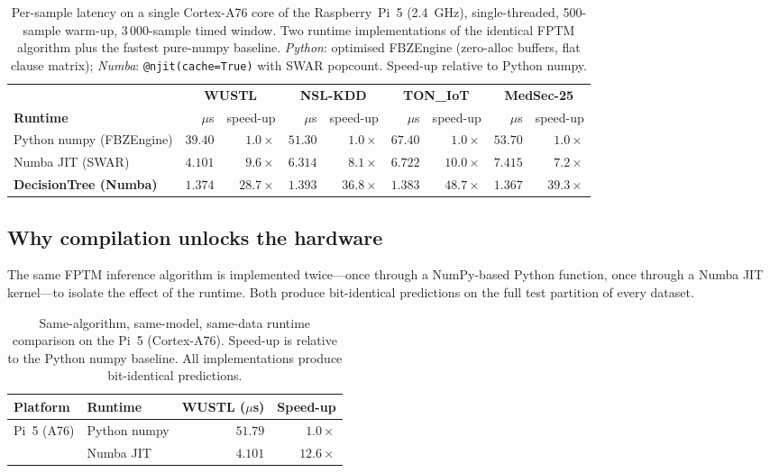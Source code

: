 \documentclass[journal,10pt]{IEEEtran}
\begin{document}
\begin{table}[t]
\centering\small
\caption{Per-sample latency on a single Cortex-A76 core of the
         Raspberry~Pi~5 (2.4~GHz), single-threaded, 500-sample warm-up,
         3\,000-sample timed window. Two runtime implementations of the
         identical FPTM algorithm plus the fastest pure-numpy baseline.
         \emph{Python}: optimised FBZEngine (zero-alloc buffers, flat clause
         matrix); \emph{Numba}: \texttt{@njit(cache=True)} with SWAR popcount.
         Speed-up relative to Python numpy.}
\label{tab:pi5_runtime}
\begin{tabular}{lrrrrrrrr}
\toprule
 & \multicolumn{2}{c}{\textbf{WUSTL}} & \multicolumn{2}{c}{\textbf{NSL-KDD}} & \multicolumn{2}{c}{\textbf{TON\_IoT}} & \multicolumn{2}{c}{\textbf{MedSec-25}} \\
\cmidrule(lr){2-3}\cmidrule(lr){4-5}\cmidrule(lr){6-7}\cmidrule(lr){8-9}
\textbf{Runtime} & $\mu$s & speed-up & $\mu$s & speed-up & $\mu$s & speed-up & $\mu$s & speed-up \\
\midrule
Python numpy (FBZEngine) & $39.40$ & $1.0\times$ & $51.30$ & $1.0\times$ & $67.40$ & $1.0\times$ & $53.70$ & $1.0\times$ \\
Numba JIT (SWAR)         & $4.101$ & $9.6\times$ & $6.314$ & $8.1\times$ & $6.722$ & $10.0\times$ & $7.415$ & $7.2\times$ \\
\midrule
\textbf{DecisionTree (Numba)} & $\mathbf{1.374}$ & $\mathbf{28.7\times}$ & $\mathbf{1.393}$ & $\mathbf{36.8\times}$ & $\mathbf{1.383}$ & $\mathbf{48.7\times}$ & $\mathbf{1.367}$ & $\mathbf{39.3\times}$ \\
\bottomrule
\end{tabular}
\end{table}

\subsection{Why compilation unlocks the hardware}
\label{sec:res-pynumba}

The same FPTM inference algorithm is implemented twice---once through a
NumPy-based Python function, once through a Numba JIT kernel---to isolate
the effect of the runtime. Both produce bit-identical predictions on the
full test partition of every dataset.

\begin{table}[t]
\centering\small
\caption{Same-algorithm, same-model, same-data runtime comparison on
         the Pi~5 (Cortex-A76). Speed-up is relative to the Python
         numpy baseline. All implementations produce bit-identical predictions.}
\label{tab:pyvsnumba}
\begin{tabular}{llrr}
\toprule
\textbf{Platform} & \textbf{Runtime} & \textbf{WUSTL ($\mu$s)} & \textbf{Speed-up} \\
\midrule
\multirow{2}{*}{Pi~5 (A76)}
 & Python numpy & $51.79$ & $1.0\times$ \\
 & Numba JIT    & $4.101$ & $\mathbf{12.6\times}$ \\
\bottomrule
\end{tabular}
\end{table}
\end{document}
